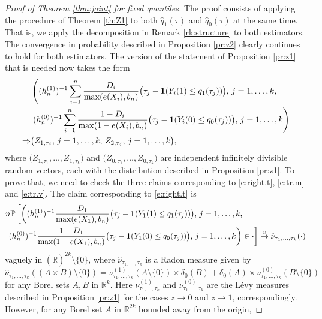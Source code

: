 \documentclass[12pt]{amsart}
\newcommand{\bbr}{\mathbb{R}}
\newcommand{\vague}{\stackrel{v}{\rightarrow}}
\newcommand{\1}{\mathbbm{1}}
\newcommand{\0}{\mathbf{0}}
\newcommand{\one}{\mathbf{1}}
\theoremstyle{plain}
\theoremstyle{definition}
\newcommand{\bbP}{\mathbb{P}}
\begin{document}
\begin{proof}[Proof of Theorem \ref{thm:joint} for fixed quantiles]
The proof consists of applying the procedure of Theorem \ref{th:Z1} to both $\hat q_1(\tau)$
and $\hat q_0(\tau)$ at the same time. That is, we apply the decomposition in Remark \ref{rk:structure} to both estimators. The convergence in probability described in Proposition \ref{pr:z2} clearly continues to hold for both estimators. The version of the statement of Proposition \ref{pr:z1} that is needed now takes the form 
 \begin{align*} 
  & \left( (h_n^{(1)})^{-1} \sum_{i=1}^n \frac{D_i}{\max(e(X_i),b_n)}
  \bigl( \tau_j-\one(Y_i(1)\leq q_1(\tau_j))\bigr), \, j=1,\ldots, k, \right. \\
  \notag  &\left.  
  (h_n^{(0)})^{-1} \sum_{i=1}^n \frac{1-D_i}{\max(1-e(X_i),b_n)}
  \bigl( \tau_j-\one(Y_i(0)\leq q_0(\tau_j))\bigr), \, j=1,\ldots, k
  \right) \\
\notag \Rightarrow&  \bigl( Z_{1,\tau_j}, \, j=1,\ldots, k, \, Z_{2,\tau_j}, \, j=1,\ldots, k
\bigr), 
\end{align*}
where $\bigl( Z_{1,\tau_1},\ldots, Z_{1,\tau_k}\bigr)$ and $\bigl( Z_{0, \tau_1},\ldots, Z_{0, \tau_k}\bigr)$ are independent infinitely divisible random vectors, each with the distribution described in Proposition \ref{pr:z1}. To prove that, we need to check the three claims corresponding to \eqref{e:right.t}, \eqref{e:tr.m} and \eqref{e:tr.v}. The claim corresponding to \eqref{e:right.t} is
%
\begin{align} \label{e:vague.2sided}
&n\bbP\left[\left( (h_n^{(1)})^{-1}\frac{D_1}{\max(e(X_1),b_n)}
  \bigl( \tau_j-\one(Y_1(1)\leq q_1(\tau_j))\bigr), \, j=1,\ldots,    k, \, \right.\right. \\ 
\notag & \left.\left.   (h_n^{(0)})^{-1}\frac{1-D_1}{\max(1-e(X_1),b_n)}
  \bigl( \tau_j-\one(Y_1(0)\leq q_0(\tau_j))\bigr), \, j=1,\ldots,    k
  \right)\in \cdot\right] \vague \hat \nu_{\tau_1,\ldots, \tau_k}(\cdot) 
\end{align}
%
vaguely in $(\overline{\bbr})^{2k}\setminus \{0\}$, where $\hat \nu_{\tau_1,\ldots, \tau_k}$ is a Radon measure given by
%
\begin{equation*} \label{e:big.Lm}
\hat \nu_{\tau_1,\ldots, \tau_k} ((A\times B) \setminus \{0\}) = \nu^{(1)}_{\tau_1,\ldots, \tau_k} (A\setminus \{0\})\times \delta_0(B) +
\delta_0(A) \times \nu^{(0)}_{\tau_1,\ldots, \tau_k} (B\setminus \{0\})
\end{equation*}
%
for any Borel sets $A,B$ in $\bbr^k$. Here   $\nu^{(1)}_{\tau_1,\ldots, \tau_k}$ and $\nu^{(0)}_{\tau_1,\ldots, \tau_k}$ are the L\'evy measures described in Proposition \ref{pr:z1} for the cases $z\to 0$ and $z\to 1$, correspondingly. However, for any  Borel set $A$ in $\bbr^{2k}$ bounded away from the origin,

\end{proof}
\end{document}
